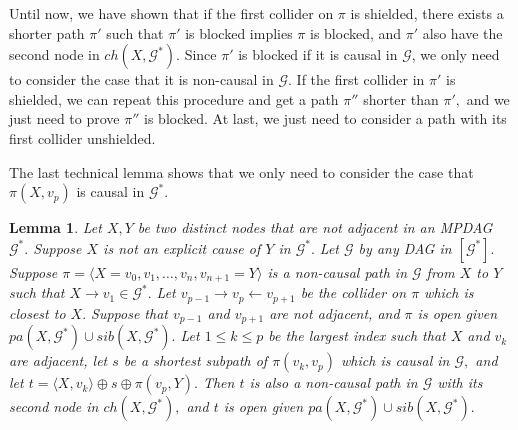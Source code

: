 \documentclass{article}
\newtheorem{lemma}{Lemma}
\begin{document}
Until now, we have shown that if the first collider on $\pi$ is shielded, there exists a shorter path $\pi'$ such that $\pi'$ is blocked implies $\pi$ is blocked, and $\pi'$ also have the second node in $ch(X,\mathcal{G}^*)$. Since $\pi'$ is blocked if it is causal in $\mathcal{G}$, we only need to consider the case that it is non-causal in $\mathcal{G}.$ If the first collider in $\pi'$ is shielded, we can repeat this procedure and get a path $\pi''$ shorter than $\pi',$ and we just need to prove $\pi''$ is blocked. At last, we just need to consider a path with its first collider unshielded.

The last technical lemma shows that we only need to consider the case that $\pi(X,v_p)$ is causal in $\mathcal{G}^*.$

\begin{lemma}
\label{lemma:explicit oin pre-causal}
Let $X,Y$ be two distinct nodes that are not adjacent in an MPDAG $\mathcal{G}^*.$ Suppose $X$ is not an explicit cause of $Y$ in $\mathcal{G}^*.$ Let $\mathcal{G}$ by any DAG in $[\mathcal{G}^*].$ Suppose $\pi=\langle X=v_0,v_1,\dots,v_n,v_{n+1}=Y\rangle$ is a non-causal path in $\mathcal{G}$ from $X$ to $Y$ such that $X\to v_1\in \mathcal{G}^*.$ Let $v_{p-1}\to v_p\leftarrow v_{p+1}$ be the collider on $\pi$ which is closest to $X.$ Suppose that $v_{p-1}$ and $v_{p+1}$ are not adjacent, and $\pi$ is open given $pa(X,\mathcal{G}^*)\cup sib(X,\mathcal{G}^*).$ Let $1\le k\le p$ be the largest index such that $X$ and $v_k$ are adjacent, let $s$ be a shortest subpath of $\pi(v_k,v_p)$ which is causal in $\mathcal{G},$ and let $t=\langle X,v_k\rangle \oplus s \oplus \pi(v_p,Y).$ Then $t$ is also a non-causal path in $\mathcal{G}$ with its second node in $ch(X,\mathcal{G}^*),$ and $t$ is open given $pa(X,\mathcal{G}^*)\cup sib(X,\mathcal{G}^*).$
\end{lemma}
\end{document}
